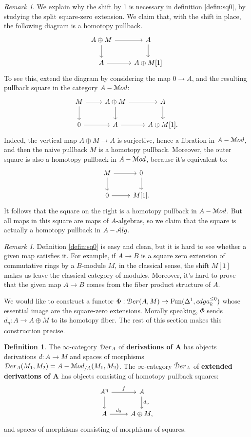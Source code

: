 \documentclass[10pt,a4paper,reqno,oneside]{book} %
\theoremstyle{plain}
\theoremstyle{definition}
\newtheorem{defin}[thm]{Definition}
\theoremstyle{remark}
\newtheorem{rem}[thm]{Remark}
\numberwithin{equation}{section}
\begin{document}
\begin{rem}
We explain why the shift by 1 is necessary in definition \ref{defin:sq0}, by studying the split square-zero extension.
We claim that, with the shift in place, the following diagram is a homotopy pullback.
\[
\begin{tikzcd}
A \oplus M \arrow{r}\arrow{d} & A\arrow{d} \\
A\arrow{r} & A\oplus M[1] 
\end{tikzcd}
\]
To see this, extend the diagram by considering the map $0 \to A$, and the resulting pullback square in the category
$A-\mathcal M od$:
\[
\begin{tikzcd}
M\arrow{r}\arrow{d} & A \oplus M \arrow{r}\arrow{d} & A\arrow{d} \\
0\arrow{r} & A\arrow{r} & A\oplus M[1] .
\end{tikzcd}
\]
Indeed, the vertical map $A\oplus M \to A$ is surjective, hence a fibration in $A-\mathcal M od$, and then the naive pullback $M$ 
is a homotopy pullback. Moreover, the outer square is also a homotopy pullback in $A-\mathcal M od$, because it's equivalent to:
\[
\begin{tikzcd}
M\arrow{r}\arrow{d} & 0\arrow{d} \\
0\arrow{r} & M[1].
\end{tikzcd}
\]
It follows that the square on the right is a homotopy pullback in $A-\mathcal M od$. But all maps in this square are maps of
$A$-algebras, so we claim that the square is actually a homotopy pullback in $A-\mathcal A lg$.
\end{rem}

\begin{rem}
Definition \ref{defin:sq0} is easy and clean, but it is hard to see whether a given map satisfies it. For example, if
$A \to B$ is a square zero extension of commutative rings by a $B$-module $M$, in the classical sense, the shift
$M[1]$ makes us leave the classical category of modules. Moreover, it's hard to prove that the given map $A \to B$
comes from the fiber product structure of $A$.
\end{rem}

We would like to construct a functor $\Phi : \mathcal D er (A,M) \to \operatorname{Fun}(\Delta^1, cdga^{\leq 0}_k)$ whose essential image are the square-zero
extensions. Morally speaking, $\Phi$ sends $d_{\eta} : A \to A \oplus M$ to its homotopy fiber. The rest of this section makes
this construction precise.

\begin{defin}
The $\infty$-category $\mathcal D er_A$ of \textbf{derivations of A} has objects derivations $d : A \to M$ and spaces of morphisms
$\mathcal D er_A(M_1, M_2) = A-\mathcal M od_{/A}(M_1,M_2)$. The $\infty$-category $ \tilde {\mathcal D} er_A$ of \textbf{extended derivations of A}
has objects consisting of homotopy pullback squares:
\[
\begin{tikzcd}
A^{\eta}\arrow{r}{f} \arrow{d} & A\arrow{d}{d_{\eta}} \\
A\arrow{r}{d_0} & A \oplus M,
\end{tikzcd}
\]
and spaces of morphisms consisting of morphisms of squares.
\end{defin}
\end{document}

